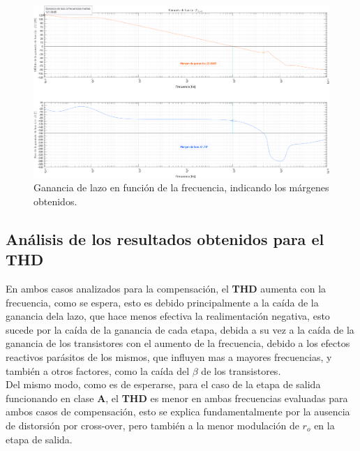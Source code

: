 \begin{figure}[H] %
\begin{center}
\includegraphics[width=0.93 \textheight, angle=90]{./img/simulaciones/Loop/gain_loop_2.png}
\caption{\label{fig:fig_loop_gain_2}\footnotesize{Ganancia de lazo en función de la frecuencia, indicando los márgenes obtenidos.}}
\end{center}
\end{figure}

\clearpage




\subsection{Análisis de los resultados obtenidos para el \textbf{THD}}

En ambos casos analizados para la compensación, el \textbf{THD} aumenta con la frecuencia, como se espera, esto es debido principalmente a la caída de la ganancia dela lazo, que hace menos efectiva la realimentación negativa, esto sucede por la caída de la ganancia de cada etapa, debida a su vez a la caída de la ganancia de los transistores con el aumento de la frecuencia, debido a los efectos reactivos parásitos de los mismos, que influyen mas a mayores frecuencias, y también a otros factores, como la caída del $\beta$ de los transistores. \\

Del mismo modo, como es de esperarse, para el caso de la etapa de salida funcionando en clase \textbf{A}, el \textbf{THD} es menor en ambas frecuencias evaluadas para ambos casos de compensación, esto se explica fundamentalmente por la ausencia de distorsión por cross-over, pero también a la menor modulación de $r_{o}$ en la etapa de salida. \\

